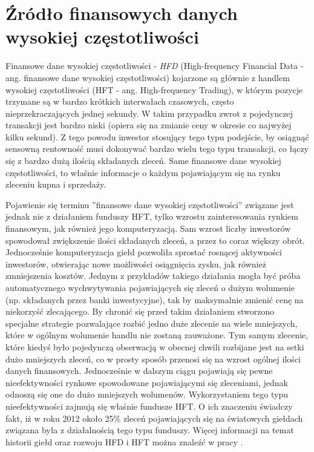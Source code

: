 \documentclass[a4paper,12pt,openany, DIV=calc, headsepline]{scrbook}
\begin{document}
\section{Źródło finansowych danych wysokiej częstotliwości}

Finansowe dane wysokiej częstotliwości  - \emph{HFD} (High-frequency Financial Data - ang. finansowe dane wysokiej częstotliwości) kojarzone są głównie z handlem wysokiej częstotliwości (HFT - ang. High-frequency Trading), w którym pozycje trzymane są w bardzo krótkich interwałach czasowych, często nieprzekraczających jednej sekundy. W takim przypadku zwrot z pojedynczej transakcji jest bardzo niski (opiera się na zmianie ceny w okresie co najwyżej kilku sekund). Z tego powodu inwestor stosujący tego typu podejście, by osiągnąć sensowną rentowność musi dokonywać bardzo wielu tego typu transakcji, co łączy się z bardzo dużą ilością składanych zleceń. Same finansowe dane wysokiej częstotliwości, to właśnie informacje o każdym pojawiającym się na rynku zleceniu kupna i sprzedaży. 

Pojawienie się terminu ''finansowe dane wysokiej częstotliwości'' związane jest jednak nie z działaniem funduszy HFT, tylko wzrostu zainteresowania rynkiem finansowym, jak również jego komputeryzacją. Sam wzrost liczby inwestorów spowodował zwiększenie ilości składanych zleceń, a przez to coraz większy obrót. Jednocześnie komputeryzacja giełd pozwoliła sprostać rosnącej aktywności inwestorów, otwierając nowe możliwości osiągnięcia zysku, jak również zmniejszenia kosztów. Jednym z przykładów takiego działania mogła być próba automatycznego wychwytywania pojawiających się zleceń o dużym wolumenie (np. składanych przez banki inwestycyjne), tak by maksymalnie zmienić cenę na niekorzyść zlecającego. By chronić się przed takim działaniem stworzono specjalne strategie pozwalające rozbić jedno duże zlecenie na wiele mniejszych, które w ogólnym wolumenie handlu nie zostaną zauważone. Tym samym zlecenie, które kiedyś było pojedynczą obserwacją w obecnej chwili rozbijane jest na setki dużo mniejszych zleceń, co w prosty sposób przenosi się na wzrost ogólnej ilości danych finansowych. Jednocześnie w dalszym ciągu pojawiają się pewne nieefektywności rynkowe spowodowane pojawiającymi się zleceniami, jednak odnoszą się one do dużo mniejszych wolumenów. Wykorzystaniem tego typu nieefektywności zajmują się właśnie fundusze HFT. O ich znaczeniu świadczy fakt, iż w roku 2012 około 25\% zleceń pojawiających się na światowych giełdach związana była z działalnością tego typu funduszy. Więcej informacji na temat historii giełd oraz rozwoju HFD i HFT można znaleźć w pracy \citep{irene2013}.
\end{document}
